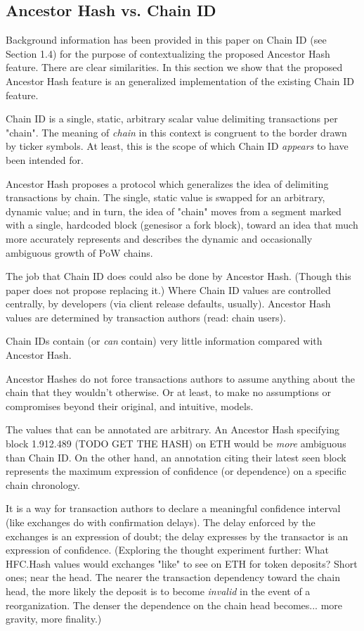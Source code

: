 \documentclass[11pt]{article}
\theoremstyle{plain}
\begin{document}
{\subsection{\small{Ancestor Hash vs. Chain ID}}

Background information has been provided in this paper on Chain ID (see Section
1.4)  for the purpose of contextualizing the proposed Ancestor Hash feature.
There are clear similarities. In this section we show that the proposed
Ancestor Hash feature is an generalized implementation of the existing Chain ID
feature.

Chain ID is a single, static, arbitrary scalar value delimiting transactions
per "chain". The meaning of \textit{chain} in this context is congruent to the
border drawn by ticker symbols. At least, this is the scope of which Chain ID
\textit{appears} to have been intended for.

Ancestor Hash proposes a protocol which generalizes the idea of delimiting
transactions by chain. The single, static value is swapped for an arbitrary,
dynamic value; and in turn, the idea of "chain" moves from a segment marked
with a single, hardcoded block (genesisor a fork block), toward an idea that
much more accurately represents and describes the dynamic and occasionally
ambiguous growth of PoW chains.

The job that Chain ID does could also be done by Ancestor Hash. (Though this
paper does not propose replacing it.)
Where Chain ID values are controlled centrally, by developers (via client
release defaults, usually). Ancestor Hash values are determined by transaction
authors (read: chain users).

Chain IDs contain (or \textit{can} contain) very little information compared
with Ancestor Hash.

Ancestor Hashes do not force transactions authors to assume anything about the
chain that they wouldn't otherwise. Or at least, to make no assumptions or
compromises beyond their original, and intuitive, models.

The values that can be annotated are arbitrary. An Ancestor Hash specifying
block 1.912.489 (TODO GET THE HASH) on ETH would be \textit{more} ambiguous
than Chain ID. On the other hand, an annotation citing their latest seen block
represents the maximum expression of confidence (or dependence) on a specific
chain chronology.

It is a way for transaction authors to declare a meaningful confidence interval
(like exchanges do with confirmation delays). The delay enforced by the
exchanges is an expression of doubt; the delay expresses by the transactor is
an expression of confidence. (Exploring the thought experiment further: What
HFC.Hash values would exchanges "like" to see on ETH for token deposits? Short
ones; near the head. The nearer the transaction dependency toward the chain
head, the more likely the deposit is to become \textit{invalid} in the event of
a reorganization. The denser the dependence on the chain head becomes... more
gravity, more finality.)

}
\end{document}
